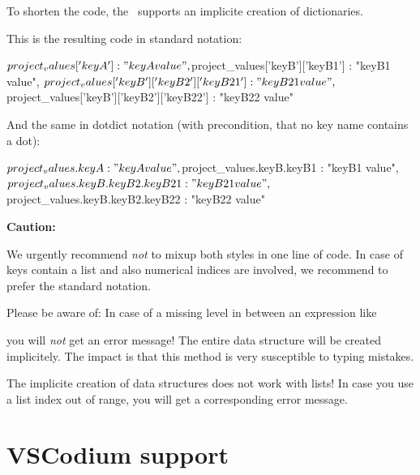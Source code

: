 To shorten the code, the \pkg\ supports an implicite creation of dictionaries.

This is the resulting code in standard notation:

\begin{pythoncode}
{
   ${project_values}['keyA'] : "keyA value",
   ${project_values}['keyB']['keyB1'] : "keyB1 value",
   ${project_values}['keyB']['keyB2']['keyB21'] : "keyB21 value",
   ${project_values}['keyB']['keyB2']['keyB22'] : "keyB22 value"
}
\end{pythoncode}

\vspace{2ex}

And the same in dotdict notation (with precondition, that no key name contains a dot):

\begin{pythoncode}
{
   ${project_values.keyA} : "keyA value",
   ${project_values.keyB.keyB1} : "keyB1 value",
   ${project_values.keyB.keyB2.keyB21} : "keyB21 value",
   ${project_values.keyB.keyB2.keyB22} : "keyB22 value"
}
\end{pythoncode}

\vspace{2ex}

\textbf{Caution:}

We urgently recommend \textit{not} to mixup both styles in one line of code. In case of keys contain a list and also numerical indices are involved,
we recommend to prefer the standard notation. 

Please be aware of: In case of a missing level in between an expression like 


you will \textit{not} get an error message! The entire data structure will be created implicitely. The impact is that this method
is very susceptible to typing mistakes.

The implicite creation of data structures does not work with lists! In case you use a list index out of range, you will get
a corresponding error message.



\newpage

\section{VSCodium support}

